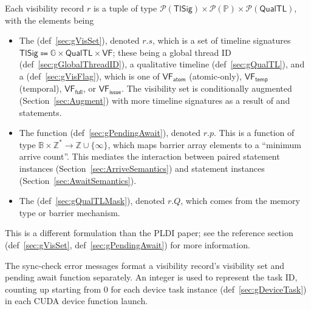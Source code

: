 

Each visibility record $r$ is a tuple of type $\mathcal{P}(\mathsf{TlSig}) \times \mathcal{P}(\mathbb{P}) \times \mathcal{P}(\textsf{QualTL})$, with the elements being
\begin{itemize}
  \item The  (def~\ref{sec:gVisSet}), denoted $r.s$, which is a set of timeline signatures $\mathsf{TlSig} \Coloneqq \mathbb{G} \times \mathsf{QualTL} \times \mathsf{VF}$; these being a global thread ID (def~\ref{sec:gGlobalThreadID}), a qualitative timeline (def~\ref{sec:gQualTL}), and a  (def~\ref{sec:gVisFlag}), which is one of $\mathsf{VF_{atom}}$ (atomic-only), $\mathsf{VF_{temp}}$ (temporal), $\mathsf{VF_{full}}$, or $\mathsf{VF_{issue}}$.
  The visibility set is conditionally augmented (Section~\ref{sec:Augment}) with more timeline signatures as a result of  and  statements.
  \item The  function (def~\ref{sec:gPendingAwait}), denoted $r.p$.
  This is a function of type $\mathbb{B} \times \mathbb{Z}^* \to \mathbb{Z} \cup \{\infty\}$, which maps barrier array elements to a ``minimum arrive count''.
  This mediates the interaction between paired  statement instances (Section~\ref{sec:ArriveSemantics}) and  statement instances (Section~\ref{sec:AwaitSemantics}).
  \item The  (def~\ref{sec:gQualTLMask}), denoted $r.Q$, which comes from the memory type or barrier mechanism.
\end{itemize}

This is a different formulation than the PLDI paper; see the reference section (def~\ref{sec:gVisSet}, def~\ref{sec:gPendingAwait}) for more information.

The sync-check error messages format a visibility record's visibility set and pending await function separately.
An integer is used to represent the task ID, counting up starting from 0 for each device task instance (def~\ref{sec:gDeviceTask}) in each CUDA device function launch.

